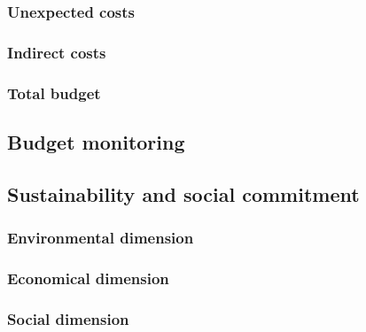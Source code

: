 \subsubsection{Unexpected costs}

\subsubsection{Indirect costs}

\subsubsection{Total budget}

\subsection{Budget monitoring}

\subsection{Sustainability and social commitment}

\subsubsection{Environmental dimension}

\subsubsection{Economical dimension}

\subsubsection{Social dimension}


